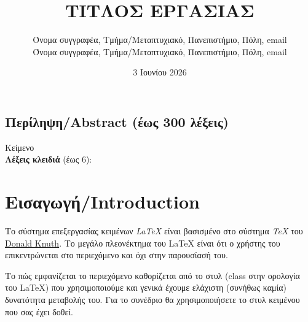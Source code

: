 \documentclass[a4paper,11pt]{article}
\title{
\huge ΤΙΤΛΟΣ ΕΡΓΑΣΙΑΣ
}
\author{Όνομα συγγραφέα, Τμήμα/Μεταπτυχιακό, Πανεπιστήμιο, Πόλη, email \\
Όνομα συγγραφέα, Τμήμα/Μεταπτυχιακό, Πανεπιστήμιο, Πόλη, email}
\date{3 Ιουνίου 2026}
\begin{document}
\maketitle


%
%
\begin{center}
\section*{Περίληψη/Abstract (έως 300 λέξεις)}
Κείμενο    
\[\]
\textbf{Λέξεις κλειδιά} (έως 6):
\end{center}

%
%
\section{Εισαγωγή/Introduction}\label{sec:intro}
Το σύστημα επεξεργασίας κειμένων \emph{\LaTeX} \cite{Lamport86} είναι βασισμένο στο σύστημα \emph{\TeX} του \href{https://en.wikipedia.org/wiki/Donald_Knuth}{Donald Knuth}. Το μεγάλο πλεονέκτημα του {\LaTeX} είναι ότι ο χρήστης του επικεντρώνεται στο περιεχόμενο και όχι στην παρουσίασή του. 

Το πώς εμφανίζεται το περιεχόμενο καθορίζεται από το στυλ (class στην ορολογία του \LaTeX) που χρησιμοποιούμε και γενικά έχουμε ελάχιστη (συνήθως καμία) δυνατότητα μεταβολής του. Για το συνέδριο θα χρησιμοποιήσετε το στυλ κειμένου που σας έχει δοθεί.

\end{document}
